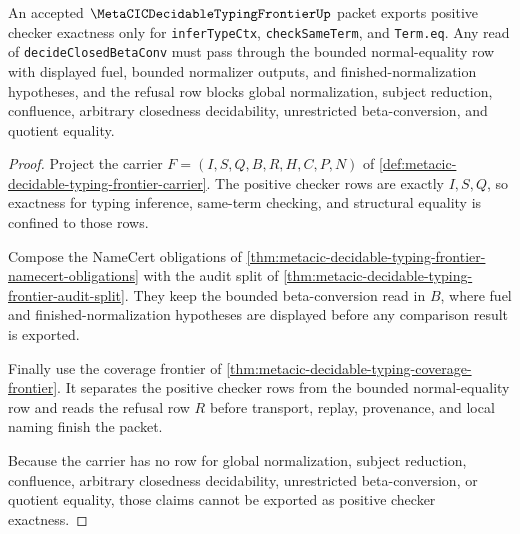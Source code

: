 \begin{theorem}
\label{thm:metacic-decidable-typing-frontier-positive-checker-exactness}
An accepted $\MetaCICDecidableTypingFrontierUp$ packet exports positive checker exactness only for \texttt{inferTypeCtx}, \texttt{checkSameTerm}, and \texttt{Term.eq}. Any read of \texttt{decideClosedBetaConv} must pass through the bounded normal-equality row with displayed fuel, bounded normalizer outputs, and finished-normalization hypotheses, and the refusal row blocks global normalization, subject reduction, confluence, arbitrary closedness decidability, unrestricted beta-conversion, and quotient equality.
\end{theorem}
\begin{proof}
Project the carrier $F=(I,S,Q,B,R,H,C,P,N)$ of \autoref{def:metacic-decidable-typing-frontier-carrier}. The positive checker rows are exactly $I,S,Q$, so exactness for typing inference, same-term checking, and structural equality is confined to those rows.

Compose the NameCert obligations of \autoref{thm:metacic-decidable-typing-frontier-namecert-obligations} with the audit split of \autoref{thm:metacic-decidable-typing-frontier-audit-split}. They keep the bounded beta-conversion read in $B$, where fuel and finished-normalization hypotheses are displayed before any comparison result is exported.

Finally use the coverage frontier of \autoref{thm:metacic-decidable-typing-coverage-frontier}. It separates the positive checker rows from the bounded normal-equality row and reads the refusal row $R$ before transport, replay, provenance, and local naming finish the packet.

Because the carrier has no row for global normalization, subject reduction, confluence, arbitrary closedness decidability, unrestricted beta-conversion, or quotient equality, those claims cannot be exported as positive checker exactness.
\end{proof}


